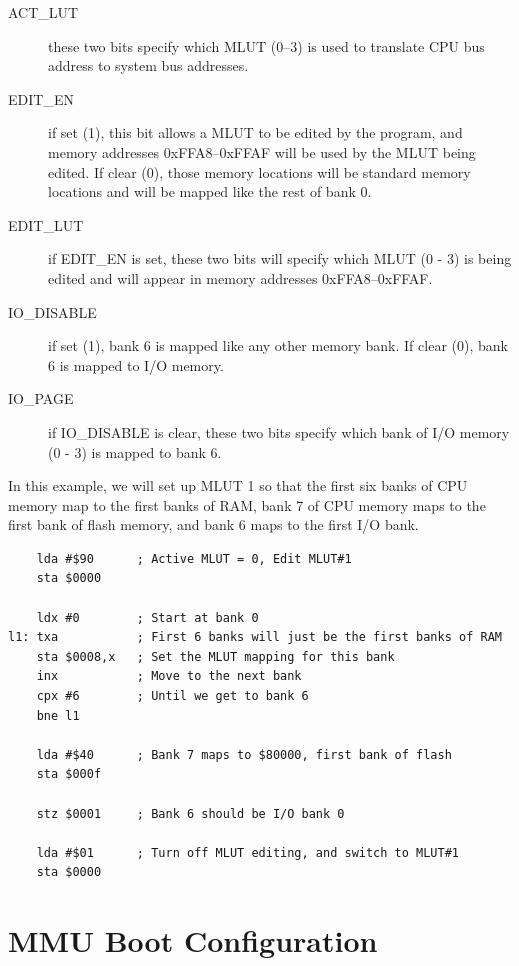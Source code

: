\begin{description}
	\item[ACT\_LUT] these two bits specify which MLUT (0--3) is used to translate CPU bus address to system bus addresses.

	\item[EDIT\_EN] if set (1), this bit allows a MLUT to be edited by the program, and memory addresses 0xFFA8--0xFFAF will be used by the MLUT being edited. If clear (0), those memory locations will be standard memory locations and will be mapped like the rest of bank 0.

	\item[EDIT\_LUT] if EDIT\_EN is set, these two bits will specify which MLUT (0 - 3) is being edited and will appear in memory addresses 0xFFA8--0xFFAF.

	\item[IO\_DISABLE] if set (1), bank 6 is mapped like any other memory bank. If clear (0), bank 6 is mapped to I/O memory.

	\item[IO\_PAGE] if IO\_DISABLE is clear, these two bits specify which bank of I/O memory (0 - 3) is mapped to bank 6.
\end{description}


In this example, we will set up MLUT 1 so that the first six banks of CPU memory map to the first banks of RAM, bank 7 of CPU memory maps to the first bank of flash memory, and bank 6 maps to the first I/O bank.

\begin{verbatim}
    lda #$90      ; Active MLUT = 0, Edit MLUT#1
    sta $0000

    ldx #0        ; Start at bank 0
l1: txa           ; First 6 banks will just be the first banks of RAM
    sta $0008,x   ; Set the MLUT mapping for this bank
    inx           ; Move to the next bank
    cpx #6        ; Until we get to bank 6
    bne l1

    lda #$40      ; Bank 7 maps to $80000, first bank of flash
    sta $000f

    stz $0001     ; Bank 6 should be I/O bank 0

    lda #$01      ; Turn off MLUT editing, and switch to MLUT#1
    sta $0000
\end{verbatim}

\section*{MMU Boot Configuration}
\label{pg:mmu_boot_config}

